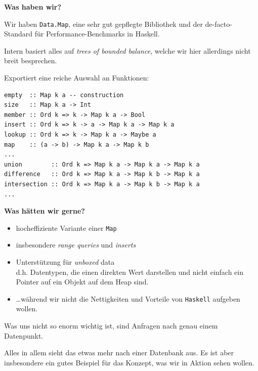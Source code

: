 \documentclass{beamer}
\begin{document}
\begin{frame}[fragile]
\textbf{Was haben wir?}
\bigskip

Wir haben \texttt{Data.Map}, eine sehr gut gepflegte Bibliothek und der de-facto-Standard für
Performance-Benchmarks in Haskell.
\pause

Intern basiert alles auf \emph{trees of bounded balance}, welche wir hier allerdings nicht breit besprechen.\pause\bigskip

Exportiert eine reiche Auswahl an Funktionen:

\begin{verbatim}
empty  :: Map k a -- construction
size   :: Map k a -> Int
member :: Ord k => k -> Map k a -> Bool
insert :: Ord k => k -> a -> Map k a -> Map k a 
lookup :: Ord k => k -> Map k a -> Maybe a 
map    :: (a -> b) -> Map k a -> Map k b 
...
union        :: Ord k => Map k a -> Map k a -> Map k a 
difference   :: Ord k => Map k a -> Map k b -> Map k a
intersection :: Ord k => Map k a -> Map k b -> Map k a 
...
\end{verbatim}
\end{frame}


\begin{frame}
\textbf{Was hätten wir gerne?}
\pause
\bigskip
\begin{itemize}
\item hocheffiziente Variante einer \texttt{Map}\pause
\item insbesondere \emph{range queries} und \emph{inserts}\pause
\item Unterstützung für \emph{unboxed} data\\
      d.h. Datentypen, die einen direkten Wert darstellen und nicht einfach ein Pointer auf ein Objekt auf dem Heap sind.\pause
\item \dots während wir nicht die Nettigkeiten und Vorteile von \texttt{Haskell} aufgeben wollen.\pause
\end{itemize}

Was uns nicht so enorm wichtig ist, sind Anfragen nach genau einem Datenpunkt.\smallskip

Alles in allem sieht das etwas mehr nach einer Datenbank aus. Es ist aber insbesondere ein gutes Beispiel für das Konzept, was wir in Aktion sehen wollen.

\end{frame}
\end{document}
